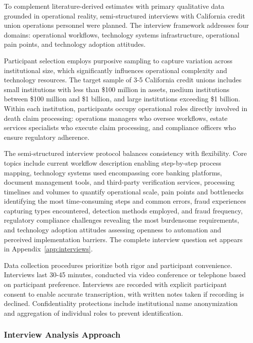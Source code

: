 To complement literature-derived estimates with primary qualitative data grounded in operational reality, semi-structured interviews with California credit union operations personnel were planned. The interview framework addresses four domains: operational workflows, technology systems infrastructure, operational pain points, and technology adoption attitudes.

Participant selection employs purposive sampling to capture variation across institutional size, which significantly influences operational complexity and technology resources. The target sample of 3-5 California credit unions includes small institutions with less than \$100 million in assets, medium institutions between \$100 million and \$1 billion, and large institutions exceeding \$1 billion. Within each institution, participants occupy operational roles directly involved in death claim processing: operations managers who oversee workflows, estate services specialists who execute claim processing, and compliance officers who ensure regulatory adherence.

The semi-structured interview protocol balances consistency with flexibility. Core topics include current workflow description enabling step-by-step process mapping, technology systems used encompassing core banking platforms, document management tools, and third-party verification services, processing timelines and volumes to quantify operational scale, pain points and bottlenecks identifying the most time-consuming steps and common errors, fraud experiences capturing types encountered, detection methods employed, and fraud frequency, regulatory compliance challenges revealing the most burdensome requirements, and technology adoption attitudes assessing openness to automation and perceived implementation barriers. The complete interview question set appears in Appendix~\ref{app:interviews}.

Data collection procedures prioritize both rigor and participant convenience. Interviews last 30-45 minutes, conducted via video conference or telephone based on participant preference. Interviews are recorded with explicit participant consent to enable accurate transcription, with written notes taken if recording is declined. Confidentiality protections include institutional name anonymization and aggregation of individual roles to prevent identification.

\subsubsection{Interview Analysis Approach}

